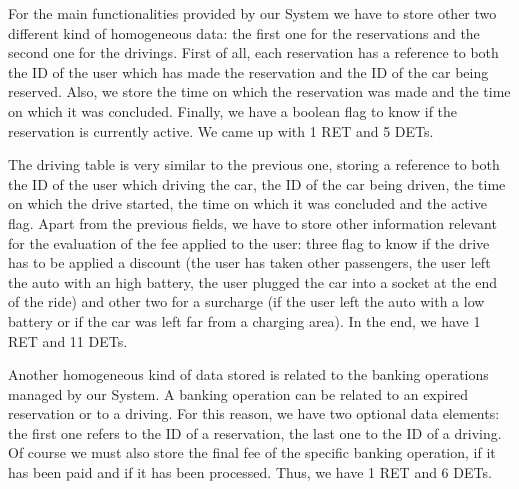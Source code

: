 For the main functionalities provided by our System we have to store other two different kind of homogeneous data: the first one for the reservations and the second one for the drivings.
First of all, each reservation has a reference to both the ID of the user which has made the reservation and the ID of the car being reserved. Also, we store the time on which the reservation was made and the time on which it was concluded. Finally, we have a boolean flag to know if the reservation is currently active.
We came up with 1 RET and 5 DETs.
\smallskip

The driving table is very similar to the previous one, storing a reference to both the ID of the user which driving the car, the ID of the car being driven, the time on which the drive started, the time on which it was concluded and the active flag. Apart from the previous fields, we have to store other information relevant for the evaluation of the fee applied to the user: three flag to know if the drive has to be applied a discount (the user has taken other passengers, the user left the auto with an high battery, the user plugged the car into a socket at the end of the ride) and other two for a surcharge (if the user left the auto with a low battery or if the car was left far from a charging area). In the end, we have 1 RET and 11 DETs.
\smallskip

Another homogeneous kind of data stored is related to the banking operations managed by our System. A banking operation can be related to an expired reservation or to a driving. For this reason, we have two optional data elements: the first one refers to the ID of a reservation, the last one to the ID of a driving. Of course we must also store the final fee of the specific banking operation, if it has been paid and if it has been processed. Thus, we have 1 RET and 6 DETs.
\smallskip

